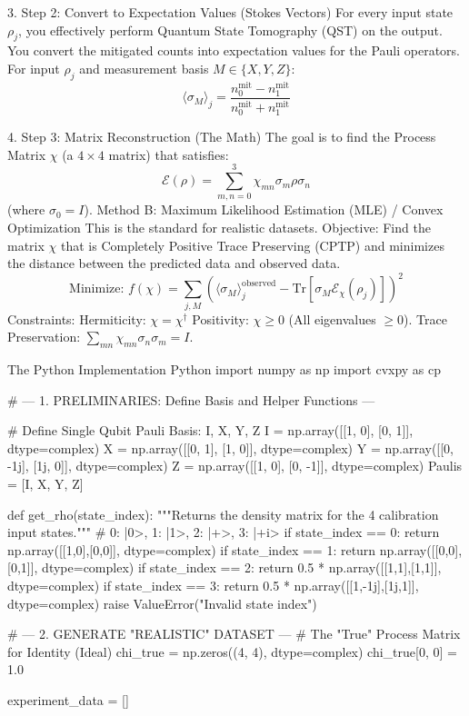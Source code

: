 3. Step 2: Convert to Expectation Values (Stokes Vectors)
For every input state $\rho_j$, you effectively perform Quantum State Tomography (QST) on the output. You convert the mitigated counts into expectation values for the Pauli operators.
For input $\rho_j$ and measurement basis $M \in \{X, Y, Z\}$:
$$\langle \sigma_M \rangle_j = \frac{n_0^{\text{mit}} - n_1^{\text{mit}}}{n_0^{\text{mit}} + n_1^{\text{mit}}}$$

4. Step 3: Matrix Reconstruction (The Math)
The goal is to find the Process Matrix $\chi$ (a $4\times4$ matrix) that satisfies:
$$\mathcal{E}(\rho) = \sum_{m,n=0}^{3} \chi_{mn} \sigma_m \rho \sigma_n$$
(where $\sigma_0 = I$).
Method B: Maximum Likelihood Estimation (MLE) / Convex Optimization
This is the standard for realistic datasets.
Objective: Find the matrix $\chi$ that is Completely Positive Trace Preserving (CPTP) and minimizes the distance between the predicted data and observed data.
$$\text{Minimize: } f(\chi) = \sum_{j, M} \left( \langle \sigma_M \rangle_j^{\text{observed}} - \text{Tr}[\sigma_M \mathcal{E}_\chi(\rho_j)] \right)^2$$
Constraints:
Hermiticity: $\chi = \chi^\dagger$
Positivity: $\chi \ge 0$ (All eigenvalues $\ge 0$).
Trace Preservation: $\sum_{mn} \chi_{mn} \sigma_n \sigma_m = I$.

The Python Implementation
Python
import numpy as np
import cvxpy as cp

# --- 1. PRELIMINARIES: Define Basis and Helper Functions ---

# Define Single Qubit Pauli Basis: {I, X, Y, Z}
I = np.array([[1, 0], [0, 1]], dtype=complex)
X = np.array([[0, 1], [1, 0]], dtype=complex)
Y = np.array([[0, -1j], [1j, 0]], dtype=complex)
Z = np.array([[1, 0], [0, -1]], dtype=complex)
Paulis = [I, X, Y, Z]

def get_rho(state_index):
    """Returns the density matrix for the 4 calibration input states."""
    # 0: |0>, 1: |1>, 2: |+>, 3: |+i>
    if state_index == 0: return np.array([[1,0],[0,0]], dtype=complex)
    if state_index == 1: return np.array([[0,0],[0,1]], dtype=complex)
    if state_index == 2: return 0.5 * np.array([[1,1],[1,1]], dtype=complex)
    if state_index == 3: return 0.5 * np.array([[1,-1j],[1j,1]], dtype=complex)
    raise ValueError("Invalid state index")

# --- 2. GENERATE "REALISTIC" DATASET --- 
# The "True" Process Matrix for Identity (Ideal)
chi_true = np.zeros((4, 4), dtype=complex)
chi_true[0, 0] = 1.0 

experiment_data = []

